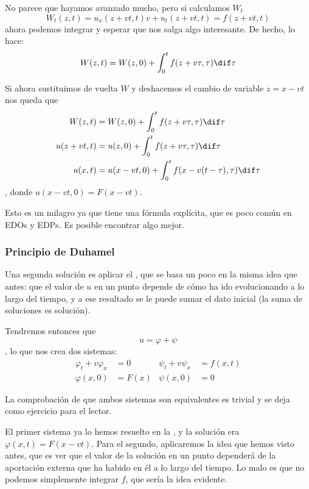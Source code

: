 			No parece que hayamos avanzado mucho, pero si calculamos $W_t$ \[
				W_t(z,t) = u_x(z + vt, t)v + u_t(z+vt, t) = f(z + vt, t)
			\] ahora podemos integrar y esperar que nos salga algo interesante. De hecho, lo hace:
			\[ W(z,t) = W(z,0) + \int^{t}_{0} f(z+v\tau, \tau)\dif\tau \]

			Si ahora sustituimos de vuelta $W$ y deshacemos el cambio de variable $z = x -vt$ nos queda que \begin{align}
			W(z,t) &= W(z,0) + \int^{t}_{0} f(z+v\tau, \tau)\dif\tau \nonumber \\
			u(z + vt, t) &= u(z,0) + \int^{t}_{0} f(z+v\tau, \tau) \dif \tau \nonumber \\
			u(x,t) &= u(x-vt,0)+ \int^{t}_{0} f(x-v(t-\tau),\tau) \dif \tau \label{eq:ModeloCombinado}
			\end{align}, donde $u(x-vt,0) = F(x-vt)$.

			Esto es un milagro ya que tiene una fórmula explícita, que es poco común en EDOs y EDPs. Es posible encontrar algo mejor.

		\subsubsection{Principio de Duhamel}
		\label{sec:PrincipioDuhamel}

			Una segunda solución es aplicar el , que se basa un poco en la misma idea que antes: que el valor de $u$ en un punto depende de cómo ha ido evolucionando a lo largo del tiempo, y a ese resultado se le puede sumar el dato inicial (la suma de soluciones es solución).

			Tendremos entonces que \[ u = \varphi + \psi \], lo que nos crea dos sistemas:
			\begin{align*}
			\varphi_t + v\varphi_x &= 0 	& \psi_t + v\psi_x &= f(x,t) \\
			\varphi(x,0) &= F(x)		& \psi(x,0) & = 0
			\end{align*}

			La comprobación de que ambos sistemas son equivalentes es trivial y se deja como ejercicio para el lector.

			El primer sistema ya lo hemos resuelto en la , y la solución era $φ(x,t) = F(x - vt)$. Para el segundo, aplicaremos la idea que hemos visto antes, que es ver que el valor de la solución en un punto dependerá de la aportación externa que ha habido en él a lo largo del tiempo. Lo malo es que no podemos simplemente integrar $f$, que sería la idea evidente.

